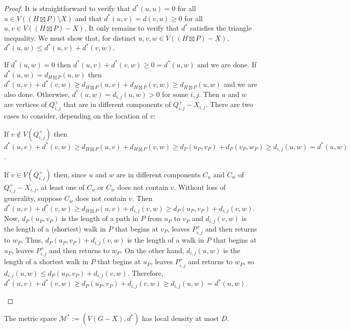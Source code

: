 \documentclass{patmorin}
\renewcommand{\ge}{\geqslant}
\renewcommand{\le}{\leqslant}
\begin{document}
\begin{proof}
  It is straightforward to verify that $d^*(u,u)=0$ for all $u\in V((H\boxtimes P)\setminus X)$ and that $d^*(u,v)=d(v,u)\ge 0$ for all $u,v\in V((H\boxtimes P)-X)$.  It only remains to verify that $d^*$ satisfies the triangle inequality.  We must show that, for distinct $u,v,w\in V((H\boxtimes P)-X)$, $d^*(u,w)\le d^*(u,v)+d^*(v,w)$.

  If $d^*(u,w)=0$ then $d^*(u,v)+d^*(v,w)\ge 0=d^*(u,w)$ and we are done.  If $d^*(u,w)=d_{H\boxtimes P}(u,w)$ then $d^*(u,v)+d^*(v,w)\ge d_{H\boxtimes P}(u,v)+d_{H\boxtimes P}(v,w)\ge d_{H\boxtimes P}(u,w)$ and we are also done.  Otherwise, $d^*(u,w)=d_{i,j}(u,w)>0$ for some $i,j$.  Then $u$ and $w$ are vertices of $Q^+_{i,j}$ that are in different components of $Q^+_{i,j}-X_{i,j}$.  There are two cases to consider, depending on the location of $v$:
  \begin{compactenum}
    \item If $v\not\in V(Q^+_{i,j})$ then $d^*(u,v)+d^*(v,w)\ge d_{H\boxtimes P}(u,v)+d_{H\boxtimes P}(v,w) \ge d_P(u_P,v_P)+d_P(v_P,w_P)\ge d_{i,j}(u,w)=d^*(u,w)$.

    \item If $v\in V(Q^+_{i,j})$ then, since $u$ and $w$ are in different components $C_u$ and $C_w$ of $Q^+_{i,j}-X_{i,j}$, at least one of $C_u$ or $C_w$ does not contain $v$.  Without loss of generality, suppose $C_w$ does not contain $v$.  Then $d^*(u,v)+d^*(v,w)\ge d_{H\boxtimes P}(u,v)+d_{i,j}(v,w) \ge d_{P}(u_P,v_P)+d_{i,j}(v,w)$.  Now, $d_{P}(u_P,v_P)$ is the length of a path in $P$ from $u_P$ to $v_P$ and $d_{i,j}(v,w)$ is the length of a (shortest) walk in $P$ that begins at $v_P$, leaves $P^+_{i,j}$ and then returns to $w_P$. Thus,   $d_{P}(u_P,v_P)+d_{i,j}(v,w)$ is the length of a walk in $P$ that begins at $u_P$, leaves $P^+_{i,j}$ and then returns to $w_P$. On the other hand, $d_{i,j}(u,w)$ is the length of a shortest walk in $P$ that begins at $u_P$, leaves $P^+_{i,j}$ and returns to $w_P$, so $d_{i,j}(u,w)\le d_P(u_P,v_P)+d_{i,j}(v,w)$.  Therefore, $d^*(u,v)+d^*(v,w)\ge d_{P}(u_P,v_P)+d_{i,j}(v,w)\ge d_{i,j}(u,w)=d^*(u,w)$. \qedhere
  \end{compactenum}
\end{proof}


\begin{lem}\label{delta_density}
  The metric space $\mathcal{M}^*:=(V(G-X),d^*)$ has local density at most $D$.
\end{lem}
\end{document}
